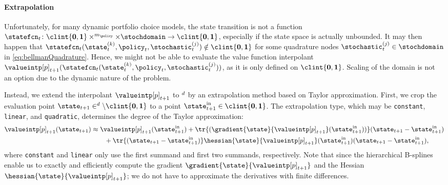 \paragraph{Extrapolation}

Unfortunately, for many dynamic portfolio choice models,
the state transition is not a function
$\statefcn_t\colon \clint{\*0, \*1} \times \real^{m_{\policy}} \times
\stochdomain \to \clint{\*0, \*1}$,
especially if the state space is actually unbounded.
It may then happen that
$\statefcn_t(\state_t^{(k)}, \policy_t, \stochastic_t^{(j)})
\notin \clint{\*0, \*1}$
for some quadrature nodes
$\stochastic_t^{(j)} \in \stochdomain$ in \eqref{eq:bellmanQuadrature}.
Hence, we might not be able to evaluate the value function interpolant
$\valueintp[p]_{t+1}(
  \statefcn_t(\state_t^{(k)}, \policy_t, \stochastic_t^{(j)})
)$, as it is only defined on $\clint{\*0, \*1}$.
Scaling of the domain is not an option due to the dynamic nature of
the problem.

Instead, we extend the interpolant $\valueintp[p]_{t+1}$
to $\real^d$ by an extrapolation method based on Taylor approximation.
First, we crop the evaluation point
$\state_{t+1} \in \real^d \setminus \clint{\*0, \*1}$ to
a point $\state_{t+1}^\mathrm{in} \in \clint{\*0, \*1}$.
The extrapolation type,
which may be \texttt{constant}, \texttt{linear}, and \texttt{quadratic},
determines the degree of the Taylor approximation:
\begin{equation}
  \begin{split}
    \valueintp[p]_{t+1}(\state_{t+1})
    &\approx \valueintp[p]_{t+1}(\state_{t+1}^\mathrm{in}) +
    \tr{(\gradient{\state}{\valueintp[p]_{t+1}}(\state_{t+1}^\mathrm{in}))}
    (\state_{t+1} - \state_{t+1}^\mathrm{in})\\
    &\qquad + \tr{(\state_{t+1} - \state_{t+1}^\mathrm{in})}
    \hessian{\state}{\valueintp[p]_{t+1}}(\state_{t+1}^\mathrm{in})
    (\state_{t+1} - \state_{t+1}^\mathrm{in}),
  \end{split}
\end{equation}
where \texttt{constant} and \texttt{linear}
only use the first summand and first two summands, respectively.
Note that since the hierarchical B-splines enable us to
exactly and efficiently compute
the gradient $\gradient{\state}{\valueintp[p]_{t+1}}$ and
the Hessian $\hessian{\state}{\valueintp[p]_{t+1}}$;
we do not have to approximate the derivatives with finite differences.



